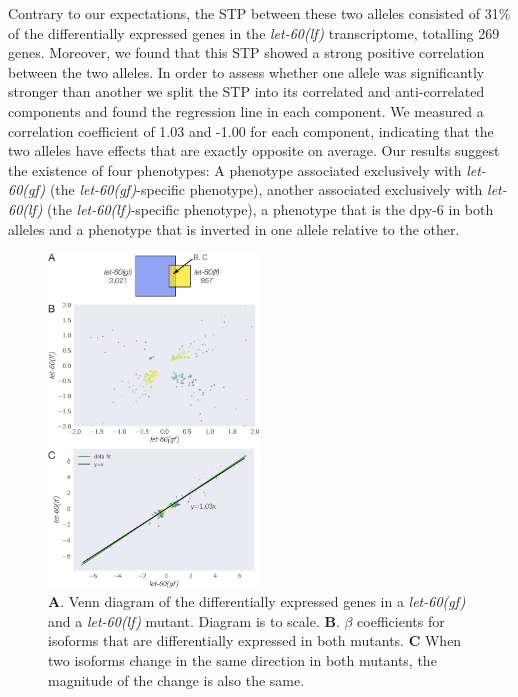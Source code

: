 \documentclass[10pt, onecolumn]{article}
\newcommand{\gene}[1]{\mbox{\emph{#1}}}
\newcommand{\letgf}{\gene{let-60(gf)}}
\newcommand{\letlf}{\gene{let-60(lf)}}
\begin{document}
Contrary to our expectations, the STP between these two alleles consisted of
31\% of the differentially expressed genes in the \letlf{} transcriptome,
totalling 269 genes. Moreover, we found that this STP showed a strong positive
correlation between the two alleles. In order to assess whether one allele was
significantly stronger than another we split the STP into its correlated and
anti-correlated components and found the regression line in each component. We
measured a correlation coefficient of 1.03 and -1.00 for each component,
indicating that the two alleles have effects that are exactly opposite on
average. Our results suggest the existence of four phenotypes: A phenotype
associated exclusively with \letgf{} (the \letgf{}-specific phenotype), another
associated exclusively with \letlf{} (the \letlf{}-specific phenotype), a
phenotype that is the dpy-6 in both alleles and a phenotype that is inverted in
one allele relative to the other.

\begin{figure}
  \centering{}
  \includegraphics[width=0.5\textwidth]{../figs/ras_allele_plots.pdf}
  \caption{
    \textbf{A}. Venn diagram of the differentially expressed genes in a \letgf{}
    and a \letlf{} mutant. Diagram is to scale.
    \textbf{B}. $\beta$ coefficients for isoforms that are differentially
    expressed in both mutants.
    \textbf{C} When two isoforms change in the same direction in both mutants,
    the magnitude of the change is also the same.
  }
\label{fig:rasplots}
\end{figure}
\end{document}
